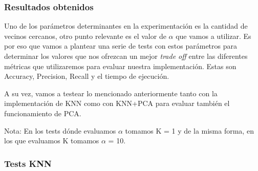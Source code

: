 

\subsubsection*{Resultados obtenidos}

Uno de los parámetros determinantes en la experimentación es la cantidad de vecinos cercanos, otro punto relevante es el valor de $\alpha$ que vamos a utilizar. Es por eso que vamos a plantear una serie de tests con estos parámetros para determinar los valores que nos ofrezcan un mejor \textit{trade off} entre las diferentes métricas que utilizaremos para evaluar nuestra implementación.\newline
Estas son Accuracy, Precision, Recall y el tiempo de ejecución.

A su vez, vamos a testear lo mencionado anteriormente tanto con la implementación de KNN como con KNN+PCA para evaluar también el funcionamiento de PCA. 

Nota: En los tests dónde evaluamos $\alpha$ tomamos K = 1 y de la misma forma, en los que evaluamos K tomamos $\alpha$ = 10. 
\subsubsection*{Tests KNN}

